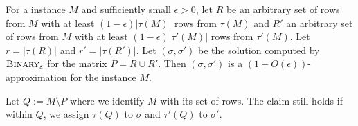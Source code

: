 \begin{lemma}\label{lem:binary-gap}
    For a \BMEC instance $M$ and sufficiently small $\epsilon > 0$,
    let $R$ be an arbitrary set of rows from $M$ with at least $(1-\epsilon)|\tau(M)|$ rows from $\tau(M)$
    and $R'$ an arbitrary set of rows from $M$ with at least $(1-\epsilon)|\tau'(M)|$ rows from $\tau'(M)$.
    Let $r = |\tau(R)|$ and $r' = |\tau(R')|$.
    Let $(\sigma, \sigma')$ be the solution computed by $\textsc{Binary}_{\epsilon}$ for the matrix $P = R \cup R'$.
    Then $(\sigma, \sigma')$ is a $(1 + O(\epsilon))$-approximation for the instance $M$.

    Let $Q := M \setminus P$ where we identify $M$ with its set of rows.
    The claim still holds if within $Q$, we assign $\tau(Q)$ to $\sigma$ and $\tau'(Q)$ to $\sigma'$.
\end{lemma}
